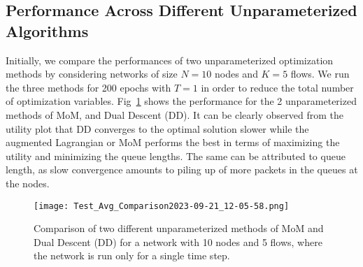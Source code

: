 \documentclass[lettersize,journal]{IEEEtran}
\begin{document}
\subsection{Performance Across Different Unparameterized Algorithms}
Initially, we compare the performances of two unparameterized optimization methods by considering networks of size $N=10$ nodes and $K=5$ flows. We run the three methods for 200 epochs with $T=1$ in order to reduce the total number of optimization variables. Fig~\ref{Fig:unpar_algo} shows the performance for the 2 unparameterized methods of MoM, and Dual Descent (DD). It can be clearly observed from the utility plot that DD converges to the optimal solution slower while the augmented Lagrangian or MoM performs the best in terms of maximizing the utility and minimizing the queue lengths. The same can be attributed to queue length, as slow convergence amounts to piling up of more packets in the queues at the nodes.
\begin{figure}[htp]%
    \centering   
    \texttt{[image: Test\_Avg\_Comparison2023-09-21\_12-05-58.png]}
    \caption{Comparison of two different unparameterized methods of MoM and Dual Descent (DD) for a network with 10 nodes and 5 flows, where the network is run only for a single time step.}
    \label{Fig:unpar_algo}
\end{figure}
\end{document}

